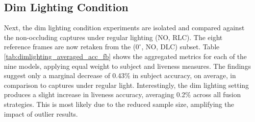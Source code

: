 \documentclass{mpaper}
\begin{document}
\subsection{Dim Lighting Condition}
Next, the dim lighting condition experiments are isolated and compared against the non-occluding captures under regular lighting (NO, RLC). The eight reference frames are now retaken from the ($0^\circ$, NO, DLC) subset. Table \ref{tab:dimlighting_averaged_acc_fb} shows the aggregated metrics for each of the nine models, applying equal weight to subject and liveness measures. The findings suggest only a marginal decrease of 0.43\% in subject accuracy, on average, in comparison to captures under regular light. Interestingly, the dim lighting setting produces a slight increase in liveness accuracy, averaging 0.2\% across all fusion strategies. This is most likely due to the reduced sample size, amplifying the impact of outlier results. 

\begin{table}[htbp]
    \centering
    \vspace{-0.4cm}
    \vspace{0.1cm}
    \caption{Averaged accuracy and $F_{0.5}$ score for the seven fusion strategies and individual modalities, isolated on the \textbf{dim lighting} settings. Equal weighting is applied to subject and liveness predictions.}
    \label{tab:dimlighting_averaged_acc_fb}
    \vspace{-0.5cm}
\end{table}
\end{document}
